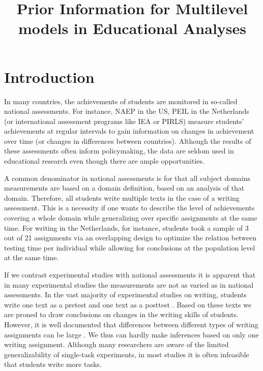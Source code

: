 \documentclass[man, floatsintext]{apa7}
\title{Prior Information for Multilevel models in Educational Analyses}
\date{}
\begin{document}
\maketitle

\section{Introduction}

In many countries, the achievements of students are monitored in so-called national assessments.
For instance, NAEP in the US, PEIL in the Netherlands (or international assessment programs like IEA or PIRLS) measure students' achievements at regular intervals to gain information on changes in achievement over time (or changes in differences between countries).
Although the results of these assessments often inform policymaking, the data are seldom used in educational research even though there are ample opportunities.

A common denominator in national assessments is for that all subject domains measurements are based on a domain definition, based on an analysis of that domain.
Therefore, all students write multiple texts in the case of a writing assessment.
This is a necessity if one wants to describe the level of achievements covering a whole domain while generalizing over specific assignments at the same time.
For writing in the Netherlands, for instance, students took a sample of 3 out of 21 assignments \parencite{zwarts1990balans} via an overlapping design to optimize the relation between testing time per individual while allowing for conclusions at the population level at the same time.

If we contrast experimental studies with national assessments it is apparent that in many experimental studies the measurements are not as varied as in national assessments.
In the vast majority of experimental studies on writing, students write one text as a pretest and one text as a posttest \parencite[e.g.,][]{graham2014conducting}.
Based on these texts we are proned to draw conclusions on changes in the writing skills of students.
However, it is well documented that differences between different types of writing assignments can be large \parencite[e.g.,][]{bouwer2015effect}.
We thus can hardly make inferences based on only one writing assignment.
Although many researchers are aware of the limited generalizability of single-task experiments, in most studies it is often infeasible that students write more tasks.
\end{document}

